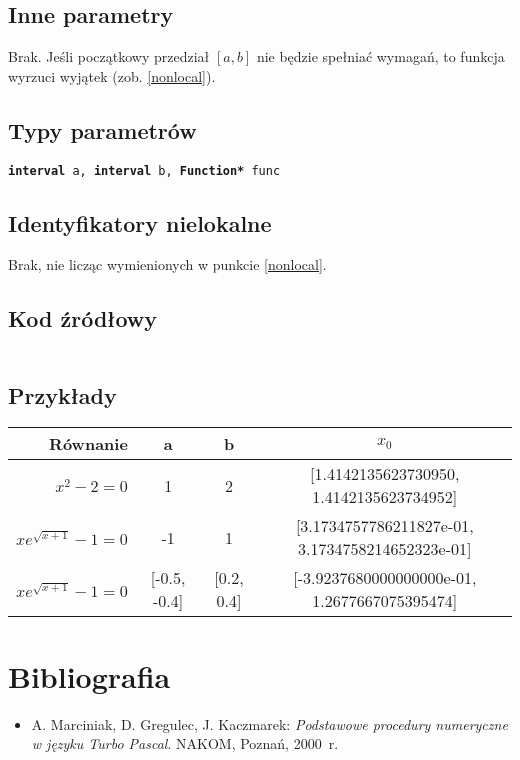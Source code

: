 \documentclass[12pt]{article}
\begin{document}
		\subsection{Inne parametry}
      Brak. Jeśli początkowy przedział $[a, b]$ nie będzie spełniać wymagań, to funkcja wyrzuci wyjątek (zob. \ref{nonlocal}).

		\subsection{Typy parametrów}
      \texttt{\textbf{interval} a, \textbf{interval} b, \textbf{Function*} func}

		\subsection{Identyfikatory nielokalne}
      Brak, nie licząc wymienionych w punkcie \ref{nonlocal}.

		\subsection{Kod źródłowy}
			\inputminted[firstline=6, lastline=39]{c++}{../solvers/secant.cpp}

		\subsection{Przykłady}
			\begin{tabular}{|r|c|c||c|}
				\hline
				Równanie & a & b & $x_0$ \\\hline

				$x^2 - 2 = 0$ & 1 & 2 & [1.4142135623730950, 1.4142135623734952]\\\hline
				$xe^{\sqrt{x+1}} - 1 = 0$ & -1 & 1 & [3.1734757786211827e-01, 3.1734758214652323e-01]\\\hline
				$xe^{\sqrt{x+1}} - 1 = 0$ & [-0.5, -0.4] & [0.2, 0.4] & [-3.9237680000000000e-01, 1.2677667075395474]\\\hline

			\end{tabular}

	\section{Bibliografia}
		\begin{itemize}
		  \item A. Marciniak, D. Gregulec, J. Kaczmarek: \textsl{Podstawowe procedury numeryczne w języku Turbo Pascal}. NAKOM, Poznań, 2000~r.
		\end{itemize}
\end{document}
